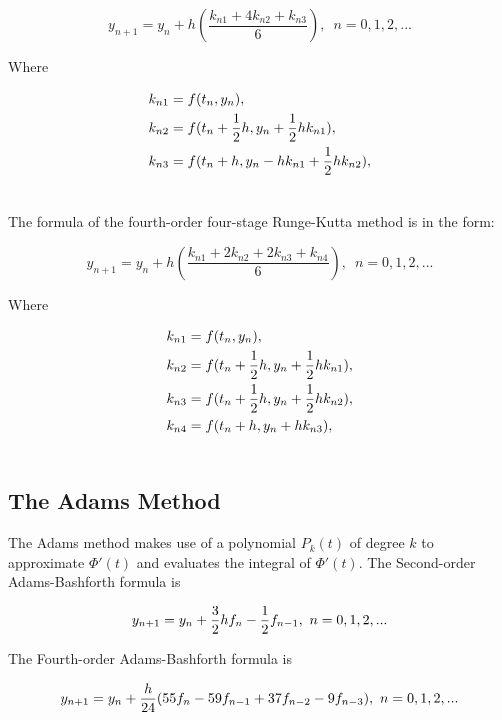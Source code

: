 \documentclass[a4paper]{article}
\begin{document}
	\begin{equation}\label{eq.4}
		y_{n+1} = y_n + h(\frac{k_{n1} + 4k_{n2} + k_{n3} }{6}), \enspace n = 0, 1, 2,...
	\end{equation}

	Where
	
	\begin{align} \nonumber
		k_{n1} &= f(t_n, y_n), \\ \nonumber
		k_{n2} &= f(t_n + {1 \over 2}h, y_n + {1 \over 2}hk_{n1}), \\ \nonumber
		k_{n3} &= f(t_n + h, y_n - hk_{n1} + {1 \over 2}hk_{n2}), \\ \nonumber
	\end{align}
	
	The formula of the fourth-order four-stage Runge-Kutta method is in the form:
	
		\begin{equation}\label{eq.4}
		y_{n+1} = y_n + h(\frac{k_{n1} + 2k_{n2} + 2k_{n3} + k_{n4} }{6}), \enspace n = 0, 1, 2,...
	\end{equation}

	Where
	
	\begin{align} \nonumber
		k_{n1} &= f(t_n, y_n), \\ \nonumber
		k_{n2} &= f(t_n + {1 \over 2}h, y_n + {1 \over 2}hk_{n1}), \\ \nonumber
		k_{n3} &= f(t_n + {1 \over 2}h, y_n + {1 \over 2}hk_{n2}), \\ \nonumber
		k_{n4} &= f(t_n + h, y_n + hk_{n3}), \\ \nonumber
	\end{align}
	\subsection{The Adams Method}
	
	The Adams method makes use of a polynomial $P_k(t)$ of degree $k$ to approximate $\Phi'(t)$ and evaluates the integral of $\Phi'(t)$.
	The Second-order Adams-Bashforth formula is
	
	\begin{equation}\label{eq.6}
		y_{n+1} = y_n + {3 \over 2}hf_n - {1 \over 2}f_{n-1}, \  n = 0,1,2,...
	\end{equation}
	
	The Fourth-order Adams-Bashforth formula is
	
	\begin{equation}\label{eq.7}
		y_{n+1} = y_n + {h \over 24}(55f_n - 59f_{n-1} + 37f_{n-2} - 9f_{n-3}), \  n = 0,1,2,...
	\end{equation}
	
\end{document}
